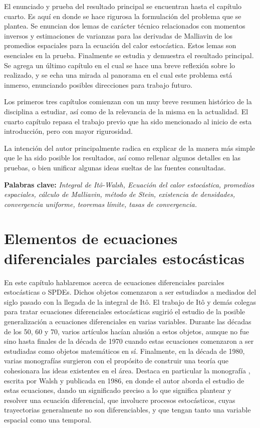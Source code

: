 \documentclass[letterpaper,twoside,12pt]{book}
\newcommand{\1}{\mathds{1}}
\theoremstyle{definition}
\theoremstyle{definition}
\theoremstyle{remark}
\theoremstyle{definition}
\theoremstyle{definition}
\theoremstyle{definition}
\theoremstyle{definition}
\theoremstyle{definition}
\begin{document}
El enunciado y prueba del resultado principal se encuentran hasta el capítulo cuarto. Es aquí en donde se hace rigurosa la formulación del problema que se plantea. Se enuncian dos lemas de carácter técnico relacionados con momentos inversos y estimaciones de varianzas para las derivadas de Malliavin de los promedios espaciales para la ecuación del calor estocástica. Estos lemas son esenciales en la prueba. Finalmente se estudia y demuestra el resultado principal. Se agrega un último capítulo en el cual se hace una breve reflexión sobre lo realizado, y se echa una mirada al panorama en el cual este problema está inmerso, enunciando posibles direcciones para trabajo futuro.

Los primeros tres capítulos comienzan con un muy breve resumen histórico de la disciplina a estudiar, así como de la relevancia de la misma en la actualidad. El cuarto capítulo repasa el trabajo previo que ha sido mencionado al inicio de esta introducción, pero con mayor rigurosidad. 

La intención del autor principalmente radica en explicar de la manera más simple que le ha sido posible los resultados, así como rellenar algunos detalles en las pruebas, o bien unificar algunas ideas sueltas de las fuentes consultadas. 


\textbf{Palabras clave:} \textit{Integral de Itô-Walsh, Ecuación del calor estocástica, promedios espaciales, cálculo de Malliavin, método de Stein, existencia de densidades, convergencia uniforme, teoremas límite, tasas de convergencia.}





\mainmatter

\chapter{Elementos de ecuaciones diferenciales parciales estocásticas}

En este capítulo hablaremos acerca de ecuaciones diferenciales parciales estocásticas o SPDEs.
Dichos objetos comenzaron a ser estudiados a mediados del siglo pasado con la llegada de la integral de Itô.
El trabajo de Itô y demás colegas para tratar ecuaciones diferenciales estocásticas sugirió el estudio de la posible generalización a ecuaciones diferenciales en varias variables.
Durante las décadas de los 50, 60 y 70, varios artículos hacían alusión a estos objetos, aunque no fue sino hasta finales de la década de 1970 cuando estas ecuaciones comenzaron a ser estudiadas como objetos matemáticos en sí.
Finalmente, en la década de 1980, varias monografías surgieron con el propósito de construir una teoría que cohesionara las ideas existentes en el área. Destaca en particular la monografía \cite{Walsh_J.B_Introduction_to_SPDEs}, escrita por Walsh  y publicada en 1986, en donde el autor aborda el estudio de estas ecuaciones, dando un significado preciso a lo que significa plantear y resolver una ecuación diferencial, que involucre procesos estocásticos, cuyas trayectorias generalmente no son diferenciables, y que tengan tanto una variable espacial como una temporal.
\end{document}
